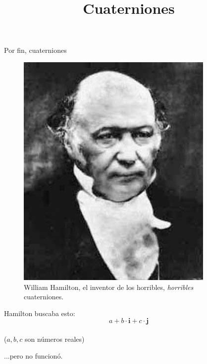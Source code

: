 \documentclass[10pt]{beamer}
\title{Cuaterniones}
\def\R{\mathbb{R}}
\begin{document}
\maketitle


\begin{frame}{Por fin, cuaterniones}

\begin{figure}  		
  	\centering
	\includegraphics[scale=0.35]{images/hamilton_cara.png}
	\caption*{William Hamilton, el inventor de los horribles, \textit{horribles} cuaterniones.}
\end{figure} \pause

	
	
Hamilton buscaba esto:
	$$a +b\cdot \textbf{i} + c \cdot \textbf{j}$$ \\
	
	($a,b,c$ son números reales) \pause
	
	...pero no funcionó.

\end{frame}
\end{document}
